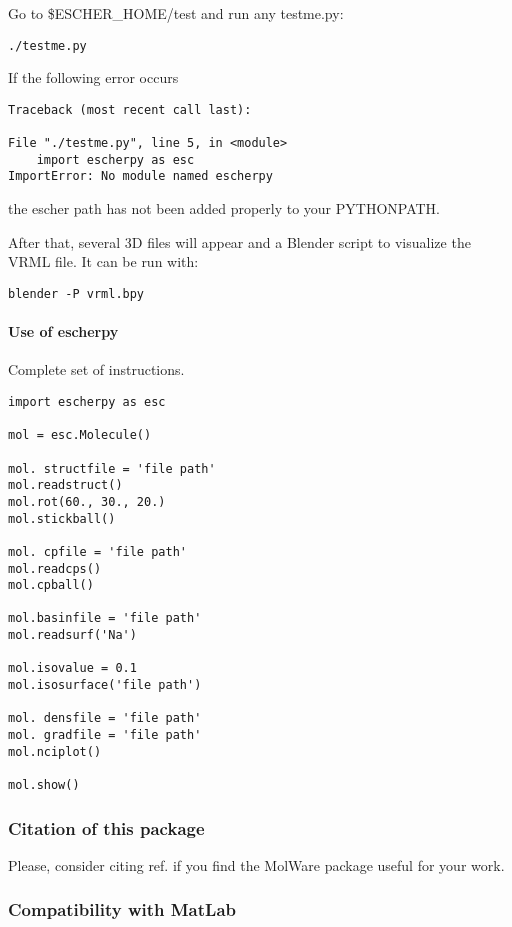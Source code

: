 \documentclass[a4paper]{article}
\begin{document}
Go to \$ESCHER\_HOME/test and run any testme.py:
%
\asciilist
\begin{lstlisting}
./testme.py
\end{lstlisting}

If the following error occurs
%
\asciilist
\begin{lstlisting}
Traceback (most recent call last):

File "./testme.py", line 5, in <module>
    import escherpy as esc
ImportError: No module named escherpy
\end{lstlisting}

the escher path has not been added properly to your PYTHONPATH.

After that, several 3D files will appear and a Blender script
to visualize the VRML file. It can be run with:
%
\asciilist
\begin{lstlisting}
blender -P vrml.bpy
\end{lstlisting}


\paragraph{Use of escherpy%
  \label{use-of-escherpy}%
}

Complete set of instructions.
%
\asciilist
\begin{lstlisting}
import escherpy as esc

mol = esc.Molecule()

mol. structfile = 'file path'
mol.readstruct()
mol.rot(60., 30., 20.)
mol.stickball()

mol. cpfile = 'file path'
mol.readcps()
mol.cpball()

mol.basinfile = 'file path'
mol.readsurf('Na')

mol.isovalue = 0.1
mol.isosurface('file path')

mol. densfile = 'file path'
mol. gradfile = 'file path'
mol.nciplot()

mol.show()
\end{lstlisting}


\subsubsection{Citation of this package%
  \label{citation-of-this-package}%
}

Please, consider citing ref. \cite{mw1} if you find the MolWare package
useful for your work.


\subsubsection{Compatibility with MatLab%
  \label{compatibility-with-matlab}%
}
\end{document}
